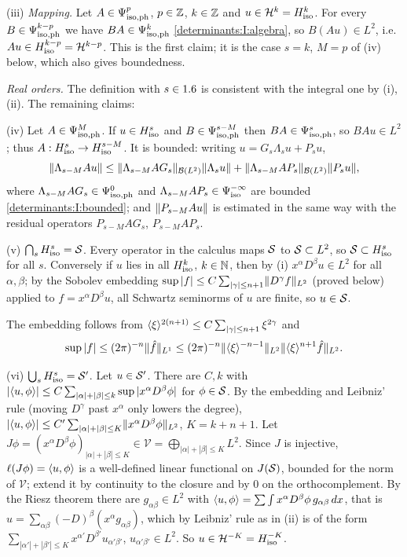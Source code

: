 (iii) \emph{Mapping.} Let $A\in\Psi^{p}_{\mathrm{iso,ph}}$, $p\in\mathbb{Z}$, $k\in\mathbb{Z}$ and $u\in\mathcal H^k=H^{k}_{\mathrm{iso}}$. For
every $B\in\Psi^{k-p}_{\mathrm{iso,ph}}$ we have $BA\in\Psi^{k}_{\mathrm{iso,ph}}$ \ref{determinants:I:algebra}, so $B(Au)\in L^2$,
i.e.\ $Au\in H^{k-p}_{\mathrm{iso}}=\mathcal H^{k-p}$. This is the first claim; it is the case $s=k$,
$M=p$ of (iv) below, which also gives boundedness.

\emph{Real orders.} The definition with $s\in1.6$ is consistent with the integral one by (i), (ii).
The remaining claims:

(iv) Let $A\in\Psi^{M}_{\mathrm{iso,ph}}$. If $u\in H^{s}_{\mathrm{iso}}$ and $B\in\Psi^{s-M}_{\mathrm{iso,ph}}$ then $BA\in\Psi^{s}_{\mathrm{iso,ph}}$,
so $BAu\in L^2$; thus $A:H^{s}_{\mathrm{iso}}\to H^{s-M}_{\mathrm{iso}}$. It is bounded: writing
$u=G_s\Lambda_su+P_su$,
\begin{equation*}
  \lVert \Lambda_{s-M}Au\rVert\le\lVert \Lambda_{s-M}AG_s\rVert_{\mathcal{B}(L^2)}\lVert \Lambda_su\rVert+\lVert \Lambda_{s-M}AP_s\rVert_{\mathcal{B}(L^2)}\lVert P_su\rVert,
\end{equation*}
where $\Lambda_{s-M}AG_s\in\Psi^{0}_{\mathrm{iso,ph}}$ and $\Lambda_{s-M}AP_s\in\Psi^{-\infty}_{\mathrm{iso}}$ are bounded
\ref{determinants:I:bounded}; and $\lVert P_{s-M}Au\rVert$ is estimated in the same way with the residual
operators $P_{s-M}AG_s$, $P_{s-M}AP_s$.

(v) $\bigcap_sH^{s}_{\mathrm{iso}}=\mathcal{S}$. Every operator in the calculus maps $\mathcal{S}$ to $\mathcal{S}\subset L^2$,
so $\mathcal{S}\subset H^{s}_{\mathrm{iso}}$ for all $s$. Conversely if $u$ lies in all $H^{k}_{\mathrm{iso}}$,
$k\in\mathbb{N}$, then by (i) $x^\alpha D^\beta u\in L^2$ for all $\alpha,\beta$; by the Sobolev embedding
$\sup|f|\le C\sum_{|\gamma|\le n+1}\lVert D^\gamma f\rVert_{L^2}$ (proved below) applied to $f=x^\alpha D^\beta u$,
all Schwartz seminorms of $u$ are finite, so $u\in\mathcal{S}$.

The embedding follows from $\langle \xi\rangle^{2(n+1)}\le C\sum_{|\gamma|\le n+1}\xi^{2\gamma}$ and
\begin{equation*}
  \sup|f|\le(2\pi)^{-n}\lVert \hat f\rVert_{L^1}\le(2\pi)^{-n}\lVert \langle \xi\rangle^{-n-1}\rVert_{L^2}\lVert \langle \xi\rangle^{n+1}\hat f\rVert_{L^2}.
\end{equation*}

(vi) $\bigcup_sH^{s}_{\mathrm{iso}}=\mathcal{S}'$. Let $u\in\mathcal{S}'$. There are $C,k$ with
$|\langle u, \phi\rangle|\le C\sum_{|\alpha|+|\beta|\le k}\sup|x^\alpha D^\beta\phi|$ for $\phi\in\mathcal{S}$. By the
embedding and Leibniz' rule (moving $D^\gamma$ past $x^\alpha$ only lowers the degree),
$|\langle u, \phi\rangle|\le C'\sum_{|\alpha|+|\beta|\le K}\lVert x^\alpha D^\beta\phi\rVert_{L^2}$, $K=k+n+1$. Let
$J\phi=(x^\alpha D^\beta\phi)_{|\alpha|+|\beta|\le K}\in\mathcal V=\bigoplus_{|\alpha|+|\beta|\le K}L^2$.
Since $J$ is injective, $\ell(J\phi)=\langle u, \phi\rangle$ is a well-defined linear functional on $J(\mathcal{S})$,
bounded for the norm of $\mathcal V$; extend it by continuity to the closure and by $0$ on the
orthocomplement. By the Riesz theorem there are $g_{\alpha\beta}\in L^2$ with
$\langle u, \phi\rangle=\sum\int x^\alpha D^\beta\phi\,g_{\alpha\beta}\,dx$, that is
$u=\sum_{\alpha\beta}(-D)^\beta(x^\alpha g_{\alpha\beta})$, which by Leibniz' rule as in (ii) is of the form
$\sum_{|\alpha'|+|\beta'|\le K}x^{\alpha'}D^{\beta'}u_{\alpha'\beta'}$, $u_{\alpha'\beta'}\in L^2$. So
$u\in\mathcal H^{-K}=H^{-K}_{\mathrm{iso}}$.

